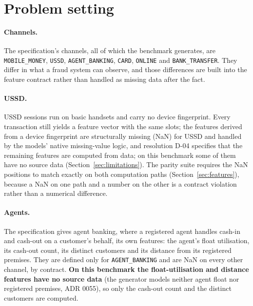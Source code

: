 \section{Problem setting}
\label{sec:setting}

\paragraph{Channels.} The specification's channels, all \nChannels{} of which the benchmark generates, are \texttt{MOBILE\_MONEY},
\texttt{USSD}, \texttt{AGENT\_BANKING}, \texttt{CARD}, \texttt{ONLINE} and
\texttt{BANK\_TRANSFER}. They differ in what a fraud system can observe, and those differences are
built into the feature contract rather than handled as missing data after the fact.

\paragraph{USSD.} USSD sessions run on basic handsets and carry no device fingerprint. Every
transaction still yields a feature vector with the same slots; the \nDeviceNaNFeatures{} features
derived from a device fingerprint are structurally missing (NaN) for USSD and handled by the models'
native missing-value logic, and resolution D-04 specifies that the remaining features are computed
from data; on this benchmark some of them have no source data (Section~\ref{sec:limitations}). The
parity suite requires the NaN positions to match exactly on both computation paths
(Section~\ref{sec:features}), because a NaN on one path and a number on the other is a contract
violation rather than a numerical difference.

\paragraph{Agents.} The specification gives agent banking, where a registered agent handles cash-in
and cash-out on a customer's behalf, its own features: the agent's float utilisation, its cash-out
count, its distinct customers and its distance from its registered premises. They are defined only
for \texttt{AGENT\_BANKING} and are NaN on every other channel, by contract. \textbf{On this
benchmark the float-utilisation and distance features have no source data} (the generator models
neither agent float nor registered premises, ADR 0055), so only the cash-out count and the distinct
customers are computed.

